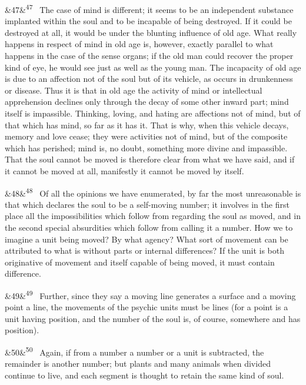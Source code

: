 \documentclass[12pt]{article}
\newcommand{\para}[1][]{\par\noindent\ifx&#1&\else\textsuperscript{\footnotesize #1}~\fi}
\begin{document}
\para[47] The case of mind is different; it seems to be an independent substance implanted within the soul and to be incapable of being destroyed. If it could be destroyed at all, it would be under the blunting influence of old age. What really happens in respect of mind in old age is, however, exactly parallel to what happens in the case of the sense organs; if the old man could recover the proper kind of eye, he would see just as well as the young man. The incapacity of old age is due to an affection not of the soul but of its vehicle, as occurs in drunkenness or disease. Thus it is that in old age the activity of mind or intellectual apprehension declines only through the decay of some other inward part; mind itself is impassible. Thinking, loving, and hating are affections not of mind, but of that which has mind, so far as it has it. That is why, when this vehicle decays, memory and love cease; they were activities not of mind, but of the composite which has perished; mind is, no doubt, something more divine and impassible. That the soul cannot be moved is therefore clear from what we have said, and if it cannot be moved at all, manifestly it cannot be moved by itself.

\para[48] Of all the opinions we have enumerated, by far the most unreasonable is that which declares the soul to be a self-moving number; it involves in the first place all the impossibilities which follow from regarding the soul as moved, and in the second special absurdities which follow from calling it a number. How we to imagine a unit being moved? By what agency? What sort of movement can be attributed to what is without parts or internal differences? If the unit is both originative of movement and itself capable of being moved, it must contain difference.

\para[49] Further, since they say a moving line generates a surface and a moving point a line, the movements of the psychic units must be lines (for a point is a unit having position, and the number of the soul is, of course, somewhere and has position).

\para[50] Again, if from a number a number or a unit is subtracted, the remainder is another number; but plants and many animals when divided continue to live, and each segment is thought to retain the same kind of soul.
\end{document}
